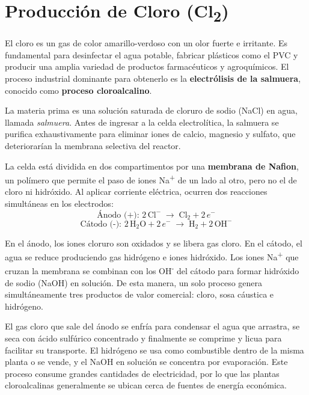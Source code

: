 \documentclass{article}
\begin{document}

    \section{Producción de Cloro (Cl\textsubscript{2})}

    El cloro es un gas de color amarillo-verdoso con un olor fuerte e irritante.
    Es fundamental para desinfectar el agua potable, fabricar plásticos como el
    PVC y producir una amplia variedad de productos farmacéuticos y agroquímicos.
    El proceso industrial dominante para obtenerlo es la \textbf{electrólisis de
    la salmuera}, conocido como \textbf{proceso cloroalcalino}.

    La materia prima es una solución saturada de cloruro de sodio (NaCl) en agua,
    llamada \textit{salmuera}. Antes de ingresar a la celda electrolítica, la
    salmuera se purifica exhaustivamente para eliminar iones de calcio, magnesio
    y sulfato, que deteriorarían la membrana selectiva del reactor.

    La celda está dividida en dos compartimentos por una \textbf{membrana de
    Nafion\textregistered{}}, un polímero que permite el paso de iones
    Na\textsuperscript{+} de un lado al otro, pero no el de cloro ni hidróxido.
    Al aplicar corriente eléctrica, ocurren dos reacciones simultáneas en los
    electrodos:
    \begin{equation}
        \text{Ánodo (+): } 2\,\text{Cl}^- \;\rightarrow\; \text{Cl}_2 + 2\,e^-
    \end{equation}
    \begin{equation}
        \text{Cátodo (-): } 2\,\text{H}_2\text{O} + 2\,e^- \;\rightarrow\;
        \text{H}_2 + 2\,\text{OH}^-
    \end{equation}

    En el ánodo, los iones cloruro son oxidados y se libera gas cloro. En el
    cátodo, el agua se reduce produciendo gas hidrógeno e iones hidróxido. Los
    iones Na\textsuperscript{+} que cruzan la membrana se combinan con los
    OH\textsuperscript{-} del cátodo para formar hidróxido de sodio (NaOH) en
    solución. De esta manera, un solo proceso genera simultáneamente tres
    productos de valor comercial: cloro, sosa cáustica e hidrógeno.

    El gas cloro que sale del ánodo se enfría para condensar el agua que arrastra,
    se seca con ácido sulfúrico concentrado y finalmente se comprime y licua para
    facilitar su transporte. El hidrógeno se usa como combustible dentro de la
    misma planta o se vende, y el NaOH en solución se concentra por evaporación.
    Este proceso consume grandes cantidades de electricidad, por lo que las plantas
    cloroalcalinas generalmente se ubican cerca de fuentes de energía económica.
\end{document}

